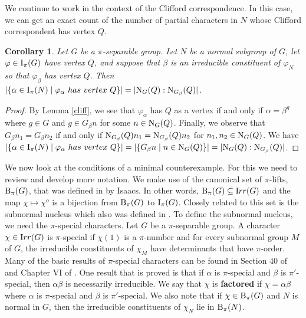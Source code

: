 \documentclass[12pt]{article}
\newtheorem{corollary}[theorem]{Corollary}
\def\irr#1{{\textrm  Irr}(#1)}
\def\norm#1#2{{\textrm N}_{#1} (#2)}
\def\B#1#2{{\textrm B}_{#1} (#2)}
\def\Bpi#1{\B {\pi}{#1}}
\def\I#1#2{{\textrm I}_{#1} (#2)}
\def\Ipi#1{\I {\pi}{#1}}
\def\phi{\varphi}
\begin{document}
We continue to work in the context of the Clifford correspondence.
In this case, we can get an exact count of the number of partial
characters in $N$ whose Clifford correspondent has vertex $Q$.

\begin{corollary}\label{cliff count}
Let $G$ be a $\pi$-separable group.  Let $N$ be a normal subgroup of
$G$, let $\phi \in \Ipi G$ have vertex $Q$, and suppose that $\beta$
is an irreducible constituent of $\phi_N$ so that $\phi_\beta$ has
vertex $Q$. Then $|\{ \alpha \in \Ipi N \mid \phi_\alpha {\textrm ~
has~vertex~} Q \}| = |\norm GQ : \norm {G_\beta}Q|$.
\end{corollary}

\begin{proof}
By Lemma \ref{cliff}, we see that $\phi_\alpha$ has $Q$ as a vertex
if and only if $\alpha = \beta^g$ where $g \in G$ and $g \in G_\beta
n$ for some $n \in \norm GQ$. Finally, we observe that $G_\beta n_1
= G_\beta n_2$ if and only if $\norm {G_\beta}Q n_1 = \norm
{G_\beta}Q n_2$ for $n_1, n_2 \in \norm GQ$.  We have $|\{ \alpha
\in \Ipi N \mid \phi_\alpha {\textrm ~ has~vertex~} Q \}| = | \{ G_\beta
n \mid n \in \norm GQ \} | = |\norm GQ :\norm {G_\beta}Q|$.
\end{proof}

We now look at the conditions of a minimal counterexample.  For this
we need to review and develop more notation.  We make use of the
canonical set of $\pi$-lifts, $\Bpi G$, that was defined in
\cite{pisep} by Isaacs.  In other words, $\Bpi G \subseteq \irr G$
and the map $\chi \mapsto \chi^o$ is a bijection from $\Bpi G$ to
$\Ipi G$.  Closely related to this set is the subnormal nucleus
which also was defined in \cite{pisep}.  To define the subnormal
nucleus, we need the $\pi$-special characters.  Let $G$ be a
$\pi$-separable group.  A character $\chi \in \irr G$ is
$\pi$-special if $\chi (1)$ is a $\pi$-number and for every
subnormal group $M$ of $G$, the irreducible constituents of $\chi_M$
have determinants that have $\pi$-order.  Many of the basic results
of $\pi$-special characters can be found in Section 40 of
\cite{hupte} and Chapter VI of \cite{Mawo}. One result that is
proved is that if $\alpha$ is $\pi$-special and $\beta$ is
$\pi'$-special, then $\alpha \beta$ is necessarily irreducible. We
say that $\chi$ is {\bf factored} if $\chi = \alpha \beta$ where
$\alpha$ is $\pi$-special and $\beta$ is $\pi'$-special.  We also
note that if $\chi \in \Bpi G$ and $N$ is normal in $G$, then the
irreducible constituents of $\chi_N$ lie in $\Bpi N$.
\end{document}
